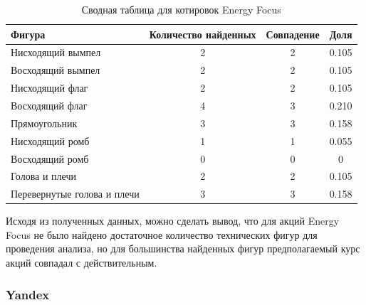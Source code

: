 \documentclass[bachelor, och, coursework]{SCWorks}
\begin{document}
    \begin{table}[!hbt]
        \caption{Сводная таблица для котировок Energy Focus}
        \centering
        \begin{tabular}{|l|c|c|c|}
        \hline
        Фигура                      & \multicolumn{1}{l|}{Количество найденных} & Совпадение & Доля  \\ \hline
        Нисходящий вымпел           & 2                                         & 2          & 0.105 \\ \hline
        Восходящий вымпел           & 2                                         & 2          & 0.105 \\ \hline
        Нисходящий флаг             & 2                                         & 2          & 0.105 \\ \hline
        Восходящий флаг             & 4                                         & 3          & 0.210 \\ \hline
        Прямоугольник               & 3                                         & 3          & 0.158 \\ \hline
        Нисходящий ромб             & 1                                         & 1          & 0.055 \\ \hline
        Восходящий ромб             & 0                                         & 0          & 0     \\ \hline
        Голова и плечи              & 2                                         & 2          & 0.105 \\ \hline
        Перевернутые голова и плечи & 3                                         & 3          & 0.158 \\ \hline
        \end{tabular}      
    \end{table}

    Исходя из полученных данных, можно сделать вывод, что для акций Energy Focus
    не было найдено достаточное количество технических фигур для проведения 
    анализа, но для большинства найденных фигур предполагаемый курс акций 
    совпадал с действительным.


    \subsubsection{Yandex}
    
\end{document}
